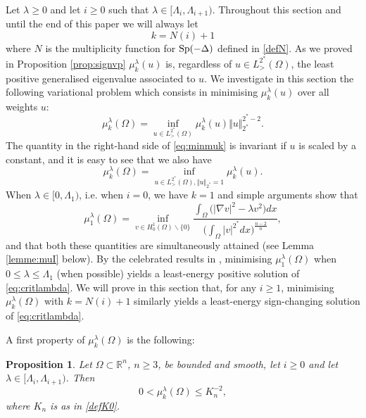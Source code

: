 \documentclass[10pt]{amsart}
\numberwithin{equation}{section}
\newcommand{\R}{\mathbb{R}}
\newcommand{\Sp}{{\rm Sp}}
\newcommand{\Om}{\Omega}
\newcommand{\mkl}{\mu_{k}^{\lambda}}
\theoremstyle{plain}
\newtheorem{prop}{Proposition}[section]%
\theoremstyle{remark}
\begin{document}
Let $\lambda \ge 0$ and let $i \ge 0$ such that  $\lambda \in [\Lambda_i, \Lambda_{i+1})$. Throughout this section and until the end of this paper we will always let 
$$ k = N(i)+1 $$
where $N$ is the multiplicity function for $\Sp(-\Delta)$ defined in \eqref{defN}. As we proved in Proposition \ref{prop:signvp} $\mkl(u)$ is, regardless of $u \in  L^{2^*}_{>}(\Om)$, the least positive generalised eigenvalue associated to $u$. We investigate in this section the following variational problem which consists in minimising $\mkl(u)$ over all weights $u$:
\begin{equation} \label{eq:minmuk}
\mkl(\Om) =  \inf_{u \in L^{2^*}_{>}(\Om)} \mkl(u) \Vert u \Vert_{2^*}^{2^*-2}.
\end{equation}
The quantity in the right-hand side of \eqref{eq:minmuk} is invariant if $u$ is scaled by a constant, and it is easy to see that we also have 
\begin{equation*} 
\mkl(\Om) = \inf_{u \in L^{2^*}_{>}(\Om), \Vert u \Vert_{2^*} = 1} \mkl(u). 
\end{equation*}
When $\lambda \in [0, \Lambda_1)$, i.e. when $i=0$, we have $k=1$ and simple arguments show that 
$$ \mu_1^{\lambda}(\Om) = \inf_{v \in H^1_0(\Om)\backslash \{0\}} \frac{\int_{\Om} \big( |\nabla v|^2 - \lambda v^2 \big)dx}{\big(\int_{\Om}|v|^{2^*}dx \big)^{\frac{n-2}{n}}}, 
$$ 
and that both these quantities are simultaneously attained (see Lemma \ref{lemme:muI} below). By the celebrated results in \cite{BN}, minimising $\mu_1^{\lambda}(\Om)$ when $0  \le \lambda \le \Lambda_1$ (when possible) yields a least-energy positive solution of  \eqref{eq:critlambda}. We will prove in this section that, for any $i \ge 1$, minimising $\mkl(\Om)$ with $k = N(i)+1$ similarly yields a least-energy sign-changing solution of \eqref{eq:critlambda}. 

\medskip 

A first property of $\mkl(\Om)$ is the following:
\begin{prop} \label{prop:ineq:large:00}
Let $\Om \subset \R^n$, $n \ge 3$, be bounded and smooth, let $i \ge0$ and let $\lambda \in [\Lambda_i, \Lambda_{i+1})$. Then 
\begin{equation} \label{ineq:mkl:large}
0 < \mkl(\Om) \le K_n^{-2},
\end{equation}
where $K_n$ is as in \eqref{defK0}.
\end{prop}
\end{document}
